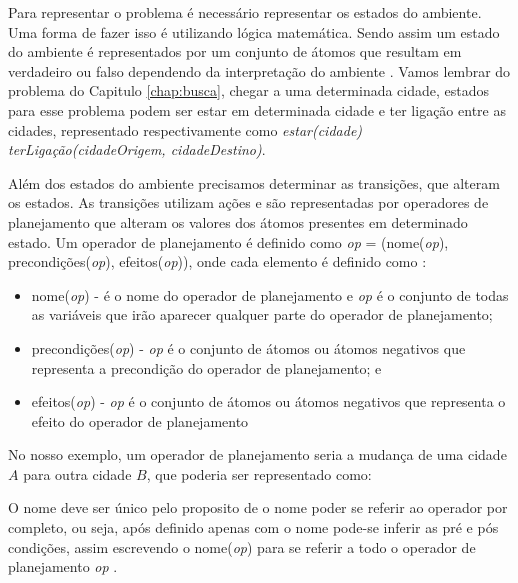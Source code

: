 Para representar o problema é necessário representar os estados do ambiente. Uma forma de fazer isso é utilizando lógica matemática. Sendo assim um estado do ambiente é representados por um conjunto de átomos que resultam em verdadeiro ou falso dependendo da interpretação do ambiente \cite{ghallab2004automated}. 
Vamos lembrar do problema do Capitulo \ref{chap:busca}, chegar a uma determinada cidade, estados para esse problema podem ser estar em determinada cidade e ter ligação entre as cidades, representado respectivamente como \textit{estar(cidade)} \textit{terLigação(cidadeOrigem, cidadeDestino)}. 

Além dos estados do ambiente precisamos determinar as transições, que alteram os estados. 
As transições utilizam ações e são representadas por operadores de planejamento que alteram os valores dos átomos presentes em determinado estado. 
Um operador de planejamento é definido como \textit{op} = (nome(\textit{op}), precondições(\textit{op}), efeitos(\textit{op})), onde cada elemento é definido como \cite{ghallab2004automated}: 

\begin{itemize}
	\item nome(\textit{op}) - é o nome do operador de planejamento e \textit{op} é o conjunto de todas as variáveis que irão aparecer qualquer parte do operador de planejamento;  
	\item precondições(\textit{op}) - \textit{op} é o conjunto de átomos ou átomos negativos que representa a precondição do operador de planejamento; e
	\item efeitos(\textit{op}) - \textit{op} é o conjunto de átomos ou átomos negativos que representa o efeito do operador de planejamento
\end{itemize}

No nosso exemplo, um operador de planejamento seria a mudança de uma cidade $A$ para outra cidade $B$, que poderia ser representado como:

O nome deve ser único pelo proposito de o nome poder se referir ao operador por completo, ou seja, após definido apenas com o nome pode-se inferir as pré e pós condições, assim escrevendo o nome(\textit{op}) para se referir a todo o operador de planejamento \textit{op} \cite{ghallab2004automated}. 

